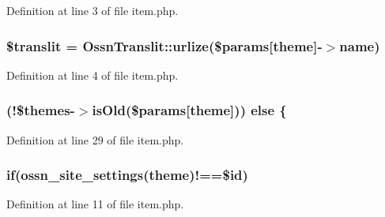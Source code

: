Definition at line 3 of file item.\+php.

\subsubsection[{\texorpdfstring{\$translit}{$translit}}]{\setlength{\rightskip}{0pt plus 5cm}\$translit = {\bf Ossn\+Translit\+::urlize}(\$params\mbox{[}\textquotesingle{}theme\textquotesingle{}\mbox{]}-\/$>${\bf name})}\hypertarget{system_2plugins_2default_2admin_2themes_2list_2item_8php_afa48855eba22ae3bb558f75039d92eb6}{}\label{system_2plugins_2default_2admin_2themes_2list_2item_8php_afa48855eba22ae3bb558f75039d92eb6}


Definition at line 4 of file item.\+php.

\subsubsection[{\texorpdfstring{else}{else}}]{ (!\$themes-\/$>$is\+Old(\$params\mbox{[}\textquotesingle{}theme\textquotesingle{}\mbox{]})) else \{}\hypertarget{system_2plugins_2default_2admin_2themes_2list_2item_8php_a74d7cf7101f5c2360425f00a411e997b}{}\label{system_2plugins_2default_2admin_2themes_2list_2item_8php_a74d7cf7101f5c2360425f00a411e997b}


Definition at line 29 of file item.\+php.

\subsubsection[{\texorpdfstring{if}{if}}]{\setlength{\rightskip}{0pt plus 5cm}if({\bf ossn\+\_\+site\+\_\+settings}(\textquotesingle{}theme\textquotesingle{})!==\$id)}\hypertarget{system_2plugins_2default_2admin_2themes_2list_2item_8php_aa56794e9bcefa38b9fc897bc948634f8}{}\label{system_2plugins_2default_2admin_2themes_2list_2item_8php_aa56794e9bcefa38b9fc897bc948634f8}


Definition at line 11 of file item.\+php.

